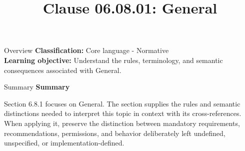 \documentclass[10pt,letterpaper]{article}
\title{Clause 06.08.01: General}
\author{}
\date{}
\begin{document}
\maketitle
\begin{CornellOverviewBox}{Overview}
\textbf{Classification:} Core language - Normative\\[2pt]
\textbf{Learning objective:} Understand the rules, terminology, and semantic consequences associated with General.
\end{CornellOverviewBox}\begin{CornellSummaryBox}{Summary}
{\sffamily\bfseries\color{Accent} Summary}\par\vspace{3pt}Section 6.8.1 focuses on General. The section supplies the rules and semantic distinctions needed to interpret this topic in context with its cross-references. When applying it, preserve the distinction between mandatory requirements, recommendations, permissions, and behavior deliberately left undefined, unspecified, or implementation-defined.
\end{CornellSummaryBox}
\end{document}
